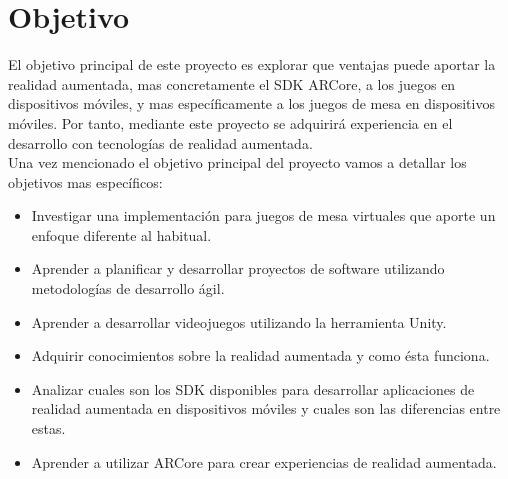 \section{Objetivo}
El objetivo principal de este proyecto es explorar que ventajas puede aportar la realidad aumentada, mas concretamente el SDK ARCore, a los juegos en dispositivos móviles, y mas específicamente a los juegos de mesa en dispositivos móviles. Por tanto, mediante este proyecto se adquirirá experiencia en el desarrollo con tecnologías de realidad aumentada.\\

Una vez mencionado el objetivo principal del proyecto vamos a detallar los objetivos mas específicos:
\begin{itemize}
  \item Investigar una implementación para juegos de mesa virtuales que aporte un enfoque diferente al habitual.
  \item Aprender a planificar y desarrollar proyectos de software utilizando metodologías de desarrollo ágil.
  \item Aprender a desarrollar videojuegos utilizando la herramienta Unity.
  \item Adquirir conocimientos sobre la realidad aumentada y como ésta funciona.
  \item Analizar cuales son los SDK disponibles para desarrollar aplicaciones de realidad aumentada en dispositivos móviles y cuales son las diferencias entre estas.
  \item Aprender a utilizar ARCore para crear experiencias de realidad aumentada.
\end{itemize}

